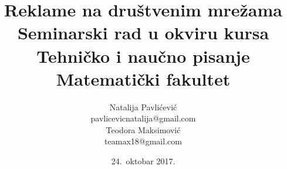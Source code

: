 \documentclass[a4paper]{article}
\begin{document}
	\title{Reklame na društvenim mrežama\\ \small{Seminarski rad u okviru kursa\\Tehničko i naučno pisanje\\ Matematički fakultet}}
	
	\author{Natalija Pavlićević\\ pavlicevicnatalija@gmail.com\\ Teodora Maksimović\\ teamax18@gmail.com}
	\date{24.~oktobar 2017.}
	
	
\end{document}
